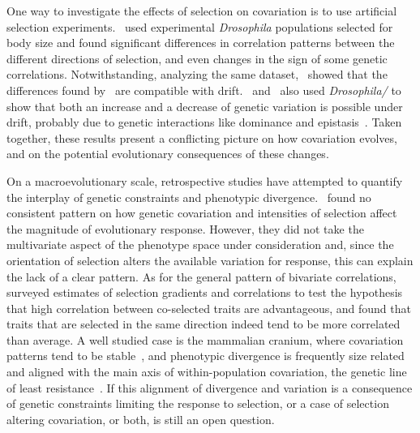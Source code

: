 \begin{refsection}
One way to investigate the effects of selection on covariation is to use
artificial selection experiments.~\textcite{Wilkinson1990-ym} used experimental
\emph{Drosophila} populations selected for body size and found
significant differences in correlation patterns between the different
directions of selection, and even changes in the sign of some genetic
correlations. Notwithstanding, analyzing the same dataset,~\textcite{Shaw1995-nb}
showed that the differences found by~\textcite{Wilkinson1990-ym} are compatible with
drift.~\textcite{Bryant1986-os} and~\textcite{Whitlock2002-yb} also used \emph{Drosophila/} to
show that both an increase and a decrease of genetic variation is
possible under drift, probably due to genetic interactions like
dominance and epistasis~\parencite{Cheverud1995-nm}. Taken together, these
results present a conflicting picture on how covariation evolves, and on
the potential evolutionary consequences of these changes.

On a macroevolutionary scale, retrospective studies have attempted to
quantify the interplay of genetic constraints and phenotypic
divergence.~\textcite{Pitchers2014-wx} found no consistent pattern on how genetic
covariation and intensities of selection affect the magnitude of
evolutionary response. However, they did not take the multivariate
aspect of the phenotype space under consideration and, since the
orientation of selection alters the available variation for response,
this can explain the lack of a clear pattern. As for the general pattern
of bivariate correlations,~\textcite{Roff2012-fe} surveyed estimates of selection
gradients and correlations to test the hypothesis that high correlation
between co-selected traits are advantageous, and found that traits that
are selected in the same direction indeed tend to be more correlated
than average. A well studied case is the mammalian cranium, where
covariation patterns tend to be stable~\parencite{Porto2009-pi}, and phenotypic
divergence is frequently size related and aligned with the main axis of
within-population covariation, the genetic line of least
resistance~\parencite{Schluter1996-gw, Marroig2010-be, Marroig2012-jd, Porto2013-dc}. If
this alignment of divergence and variation is a consequence of genetic
constraints limiting the response to selection, or a case of selection
altering covariation, or both, is still an open question.


\end{refsection}
